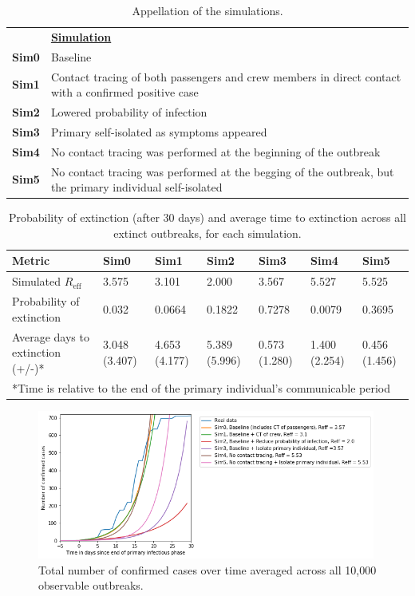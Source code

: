 \documentclass[sr]{drdc-report}
\def\Reff{\ensuremath{R_\mathrm{eff}}}
\begin{document}
\begin{table}
\centering
\caption{Appellation of the simulations.}\label{table_DPsimsNames}
\begin{tabular}{|p{1.5cm}p{10cm}|}
\hline
& \textbf{\underline{Simulation}}\\
 \textbf{Sim0} &Baseline\\
 \textbf{Sim1} &Contact tracing of both passengers and crew members in direct contact with a confirmed positive case\\
 \textbf{Sim2}  &Lowered probability of infection\\
 \textbf{Sim3}  &Primary self-isolated as symptoms appeared\\
 \textbf{Sim4}  &No contact tracing was performed at the beginning of the outbreak\\
 \textbf{Sim5}  &No contact tracing was performed at the begging of the outbreak, but the primary individual self-isolated\\
\hline
\end{tabular}
\end{table}

\begin{table}
\centering
\caption{Probability of extinction (after 30 days) and average time to extinction across all extinct outbreaks, for each simulation.}\label{table_DPextResults}
\begin{tabular}{p{4.7cm}|p{1.0cm}|p{1.2cm}p{1.2cm}p{1.2cm}p{1.2cm}p{1.2cm}}
\hline
\textbf{Metric} & \textbf{Sim0} & \textbf{Sim1} & \textbf{Sim2} & \textbf{Sim3} & \textbf{Sim4} & \textbf{Sim5} \\
\hline
Simulated \Reff & 3.575 & 3.101 & 2.000 & 3.567 & 5.527 & 5.525\\
Probability of extinction & 0.032 & 0.0664 & 0.1822 & 0.7278 & 0.0079 & 0.3695\\
Average days to extinction (+/-)* & 3.048 (3.407) & 4.653 (4.177) & 5.389 (5.996) & 0.573 (1.280)  & 1.400 (2.254) & 0.456 (1.456)\\
\hline
\multicolumn{7}{p{11.7cm}}{*Time is relative to the end of the primary individual's communicable period}\\
\end{tabular}
\end{table}

\begin{figure}
  \includegraphics[width=0.99\textwidth, keepaspectratio=true]{figures/DP_posTest}
  \caption{Total number of confirmed cases over time averaged across all 10,000 observable outbreaks.}\label{fig_DP_posTest}
\end{figure}
\end{document}
